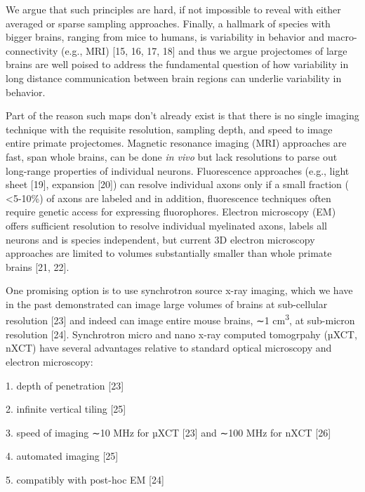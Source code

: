 \documentclass{article}
\begin{document}
We argue that such principles are hard, if not impossible to reveal with either averaged or sparse sampling approaches. Finally, a hallmark of species with bigger brains, ranging from mice to humans, is variability in behavior and macro-connectivity (e.g., MRI) [15, 16, 17, 18] and thus we argue projectomes of large brains are well poised to address the fundamental question of how variability in long distance communication between brain regions can underlie variability in behavior.

Part of the reason such maps don’t already exist is that there is no single imaging technique with the requisite resolution, sampling depth, and speed to image entire primate projectomes. Magnetic resonance imaging (MRI) approaches are fast, span whole brains, can be done \emph{in vivo} but lack resolutions to parse out long-range properties of individual neurons. Fluorescence approaches (e.g., light sheet [19], expansion [20]) can resolve individual axons only if a small fraction ( <5-10\%) of axons are labeled and in addition, fluorescence techniques often require genetic access for expressing fluorophores. Electron microscopy (EM) offers sufficient resolution to resolve individual myelinated axons, labels all neurons and is species independent, but current 3D electron microscopy approaches are limited to volumes substantially smaller than whole primate brains [21, 22].

One promising option is to use synchrotron source x-ray imaging, which we have in the past demonstrated can image large volumes of brains at sub-cellular resolution [23] and indeed can image entire mouse brains, ∼1 cm\textsuperscript{3}, at sub-micron resolution [24]. Synchrotron micro and nano x-ray computed tomogrpahy (µXCT, nXCT) have several advantages relative to standard optical microscopy and electron microscopy:

\begin{hangpars}\setlength{\parindent}{0pt}
1. depth of penetration [23]

2. infinite vertical tiling [25]

3. speed of imaging ∼10 MHz for µXCT [23] and ∼100 MHz for nXCT [26]

4. automated imaging [25]

5. compatibly with post-hoc EM [24]
\end{hangpars}
\end{document}
